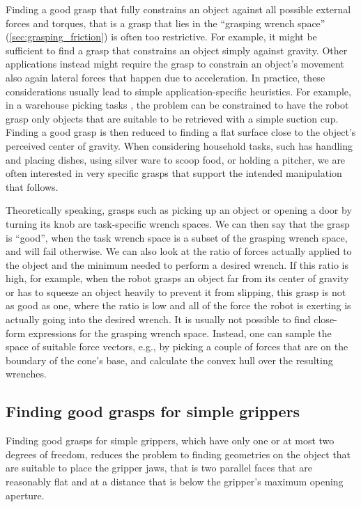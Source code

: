 Finding a good grasp that fully constrains an object against all possible external forces and torques, that is a grasp that lies in the ``grasping wrench space'' (\cref{sec:grasping_friction}) is often too restrictive. For example, it might be sufficient to find a grasp that constrains an object simply against gravity. Other applications instead might require the grasp to constrain an object's movement also again lateral forces that happen due to acceleration. In practice, these considerations usually lead to simple application-specific heuristics. For example, in a warehouse picking tasks \cite{correll2016analysis}, the problem can be constrained to have the robot grasp only objects that are suitable to be retrieved with a simple suction cup. Finding a good grasp is then reduced to finding a flat surface close to the object's perceived center of gravity. When considering household tasks, such has handling and placing dishes, using silver ware to scoop food, or holding a pitcher, we are often interested in very specific grasps that support the intended manipulation that follows.

Theoretically speaking, grasps such as picking up an object or opening a door by turning its knob are task-specific wrench spaces. We can then say that the grasp is ``good'', when the task wrench space is a subset of the grasping wrench space, and will fail otherwise. We can also look at the ratio of forces actually applied to the object and the minimum needed to perform a desired wrench. If this ratio is high, for example, when the robot grasps an object far from its center of gravity or has to squeeze an object heavily to prevent it from slipping, this grasp is not as good as one, where the ratio is low and all of the force the robot is exerting is actually going into the desired wrench. It is usually not possible to find close-form expressions for the grasping wrench space. Instead, one can sample the space of suitable force vectors, e.g., by picking a couple of forces that are on the boundary of the cone's base, and calculate the convex hull over the resulting wrenches.

\subsection{Finding good grasps for simple grippers}
Finding good grasps for simple grippers, which have only one or at most two degrees of freedom, reduces the problem to finding geometries on the object that are suitable to place the gripper jaws, that is two parallel faces that are reasonably flat and at a distance that is below the gripper's maximum opening aperture.


